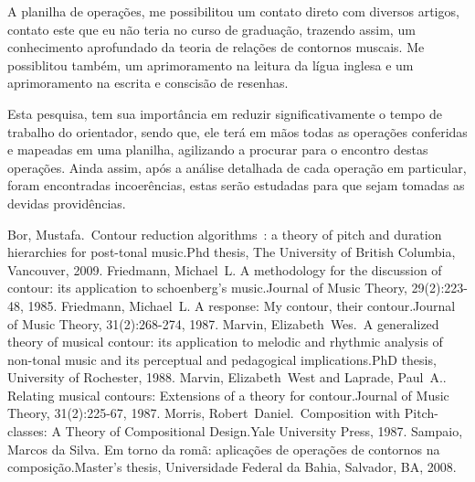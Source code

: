 \documentclass[11pt]{article}
\begin{document}
\label{sec:resultados}

A planilha de operações, me possibilitou um contato direto com diversos 
artigos, contato este que eu não teria no curso de graduação, trazendo
assim, um conhecimento aprofundado da teoria de relações de contornos
muscais. Me possiblitou também, um aprimoramento na leitura da lígua inglesa e 
um aprimoramento na escrita e conscisão de resenhas.

\label{sec:discussao}

Esta pesquisa, tem sua importância em reduzir significativamente o tempo
de trabalho do orientador, sendo que, ele terá em mãos todas as operações
conferidas e mapeadas em uma planilha, agilizando a procurar para o encontro
destas operações.
Ainda assim, após a análise detalhada de cada operação em particular, foram
encontradas incoerências, estas serão estudadas para que sejam tomadas as 
devidas providências.


Bor, Mustafa. Contour reduction algorithms : a theory of pitch and duration hierarchies for post-tonal music.Phd thesis, The University of British Columbia, Vancouver, 2009.
Friedmann, Michael L. A methodology for the discussion of contour: its application to schoenberg’s music.Journal of Music Theory, 29(2):223-48, 1985.
Friedmann, Michael L. A response: My contour, their contour.Journal of Music Theory, 31(2):268-274, 1987.
Marvin, Elizabeth Wes. A generalized theory of musical contour: its application to melodic and rhythmic analysis of non-tonal music and its perceptual and pedagogical implications.PhD thesis, University of Rochester, 1988.
Marvin, Elizabeth West and Laprade, Paul A.. Relating musical contours: Extensions of a theory for contour.Journal of Music Theory, 31(2):225-67, 1987.
Morris, Robert Daniel. Composition with Pitch-classes: A Theory of Compositional Design.Yale University Press, 1987.
Sampaio, Marcos da Silva. Em torno da romã: aplicações de operações de contornos na composição.Master’s thesis, Universidade Federal da Bahia, Salvador, BA, 2008.
\renewcommand{\refname}{Referências bibliográficas  (máximo 15)}
\end{document}
